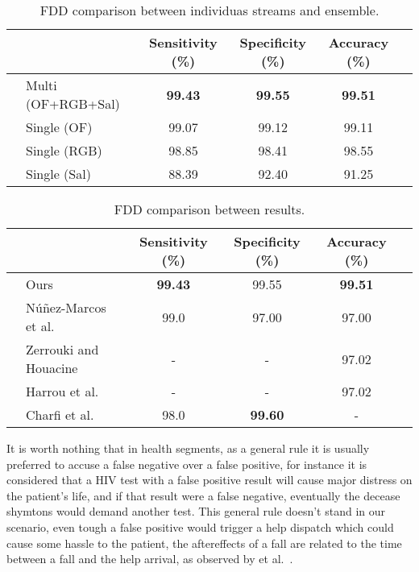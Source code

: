 \documentclass[conference]{IEEEtran}
\begin{document}
\begin{table*}[t]
\centering
\caption{FDD comparison between individuas streams and ensemble.}
\label{tab:fdd-ensem}
\begin{tabular}{llcccl}
\hline
 &                      & Sensitivity (\%)  & Specificity (\%)  & Accuracy (\%)     &  \\ \hline
 & Multi (OF+RGB+Sal)   & \textbf{99.43}    & \textbf{99.55}    & \textbf{99.51}    &  \\
 & Single (OF)          & 99.07             & 99.12             & 99.11             &  \\
 & Single (RGB)         & 98.85             & 98.41             & 98.55             &  \\
 & Single (Sal)         & 88.39             & 92.40             & 91.25             & \\ \hline
\end{tabular}
\end{table*}

\begin{table*}[t]
\centering
\caption{FDD comparison between results.}
\label{tab:fdd-our-their}
\begin{tabular}{llcccl}
\hline
 &                          & Sensitivity (\%)  & Specificity (\%)  & Accuracy (\%)     & \\ \hline
 & Ours                     & \textbf{99.43}    & 99.55             & \textbf{99.51}    & \\
 & N\'u\~nez-Marcos et al.~\cite{nunez2017vision}  & 99.0              & 97.00             & 97.00             & \\
 & Zerrouki and Houacine~\cite{zerrouki2018vision}    & -                 & -                 & 97.02             & \\
 & Harrou et al.~\cite{harrou2017vision}    & -                 & -                 & 97.02             & \\
 & Charfi et al.~\cite{charfi2013optimised}            & 98.0              & \textbf{99.60}    & -                 & \\ \hline
\end{tabular}
\end{table*}

 It is worth nothing that in health segments, as a general rule it is usually preferred to accuse a false negative over a false positive, for instance it is considered that a HIV test with a false positive result will cause major distress on the patient's life, and if that result were a false negative, eventually the decease shymtons would demand another test. This general rule doesn't stand in our scenario, even tough a false positive would trigger a help dispatch which could cause some hassle to the patient, the aftereffects of a fall are related to the time between a fall and the help arrival, as observed by et al.~\cite{}.
 
\end{document}

